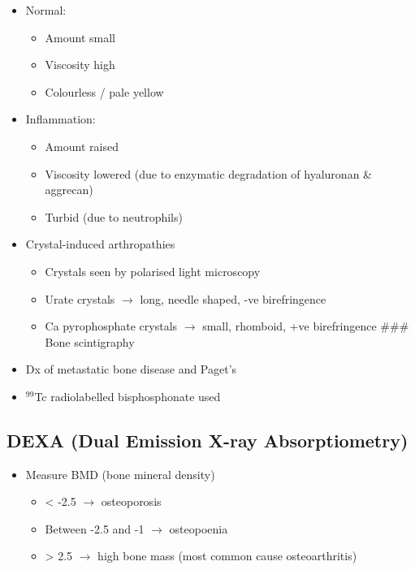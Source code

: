 \documentclass[
  12pt,
]{memoir}
\providecommand{\tightlist}{%
  \setlength{\itemsep}{0pt}\setlength{\parskip}{0pt}}
\begin{document}
\begin{itemize}
\tightlist
\item
  Normal:

  \begin{itemize}
  \tightlist
  \item
    Amount small
  \item
    Viscosity high
  \item
    Colourless / pale yellow
  \end{itemize}
\item
  Inflammation:

  \begin{itemize}
  \tightlist
  \item
    Amount raised
  \item
    Viscosity lowered (due to enzymatic degradation of hyaluronan \&
    aggrecan)
  \item
    Turbid (due to neutrophils)
  \end{itemize}
\item
  Crystal-induced arthropathies

  \begin{itemize}
  \tightlist
  \item
    Crystals seen by polarised light microscopy
  \item
    Urate crystals \(\rightarrow\) long, needle shaped, -ve
    birefringence
  \item
    Ca pyrophosphate crystals \(\rightarrow\) small, rhomboid, +ve
    birefringence \#\#\# Bone scintigraphy
  \end{itemize}
\item
  Dx of metastatic bone disease and Paget's
\item
  \(^99\)Tc radiolabelled bisphosphonate used
\end{itemize}

\hypertarget{dexa-dual-emission-x-ray-absorptiometry}{%
\subsection{DEXA (Dual Emission X-ray
Absorptiometry)}\label{dexa-dual-emission-x-ray-absorptiometry}}

\begin{itemize}
\tightlist
\item
  Measure BMD (bone mineral density)

  \begin{itemize}
  \tightlist
  \item
    \textless{} -2.5 \(\rightarrow\) osteoporosis
  \item
    Between -2.5 and -1 \(\rightarrow\) osteopoenia
  \item
    \textgreater{} 2.5 \(\rightarrow\) high bone mass (most common cause
    osteoarthritis)
  \end{itemize}
\end{itemize}
\end{document}
